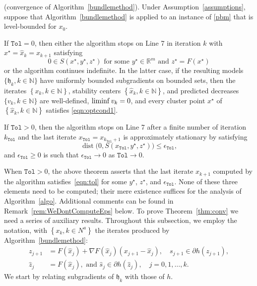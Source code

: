 \documentclass[smallextended,envcountsect]{svjour3}
\newcommand{\col}[1]{\left\{#1\right\}}
\newcommand{\tol}{\texttt{Tol}}
\newcommand{\modelh}{\mathfrak{h}}
\newcommand{\nats}{\mathbb{N}}
\newcommand{\reals}{\mathbb{R}}
\newcommand{\nliminf}{\mathop{\rm liminf}\nolimits}
\DeclareMathOperator{\dist}{dist}
\begin{document}
\begin{theorem}{\rm (convergence of Algorithm~\ref{bundlemethod}).}\label{thm:conv} Under Assumption~\ref{assumptions}, suppose that Algorithm~\ref{bundlemethod} is applied to an instance of \eqref{pbm} that is level-bounded for $x_0$. 

If $\tol=0$, then either the algorithm stops on Line 7 in iteration $k$ with $x^\star = \hat x_k = x_{k+1}$ satisfying 
\begin{equation}\label{eqn:optcond1}
0\in S(x^\star,y^\star,z^\star) \text{ for some } y^\star\in \reals^m \mbox{ and } z^\star=F(x^\star)
\end{equation}
or the algorithm continues indefinite. In the latter case, if the resulting models $\{\modelh_k, k\in \nats\}$ have uniformly bounded subgradients on bounded sets, then the iterates $\col{x_k,k\in \nats}$, stability centers $\col{\hat x_k,k\in \nats}$, and predicted decreases $\{v_k,k\in \nats\}$ are well-defined, $\nliminf v_k = 0$, and every cluster point $x^\star$ of $\col{\hat x_k,k\in \nats}$ satisfies \eqref{eqn:optcond1}.

If $\tol>0$, then the algorithm stops on Line 7 after a finite number of iteration $k_\tol$ and the last iterate $ x_\tol=x_{k_\tol+1}$ is approximately stationary by satisfying
\[
\dist\big(0, S(x_\tol,y^\star ,z^\star)\big) \leq \epsilon_\tol,
\]
and $\epsilon_\tol\geq 0$ is such that $\epsilon_\tol \to 0$ as $\tol \to 0$.
\end{theorem}

When $\tol > 0$, the above theorem asserts that the last iterate $x_{k+1}$ computed by the algorithm satisfies~\eqref{eqn:tol} for some $y^\star$, $z^\star$, and $\epsilon_\tol$. None of these three elements need to be computed; their mere existence suffices for the analysis of Algorithm~\ref{algo}. Additional comments can be found in Remark~\ref{rem:WeDontComputeEps} below.
%
To prove Theorem~\ref{thm:conv} we need a series  of auxiliary results. Throughout this subsection, we employ the notation, with $\col{x_k, k \in N^a}$ the iterates produced by Algorithm~\ref{bundlemethod}:
\begin{subequations}\label{zjj}
\begin{align}
z_{j+1}& =F(\hat x_j)+\nabla F(\hat x_j) (x_{j+1}-\hat x_j), \quad s_{j+1} \in \partial h(z_{j+1}), \\
\hat z_j& = F(\hat x_j), \mbox{ and } \hat s_j \in \partial h(\hat z_j), \quad j = 0, 1, \ldots, k.%
\end{align}
\end{subequations}
We start by relating subgradients of $\modelh_k$ with those of $h$.
\end{document}
